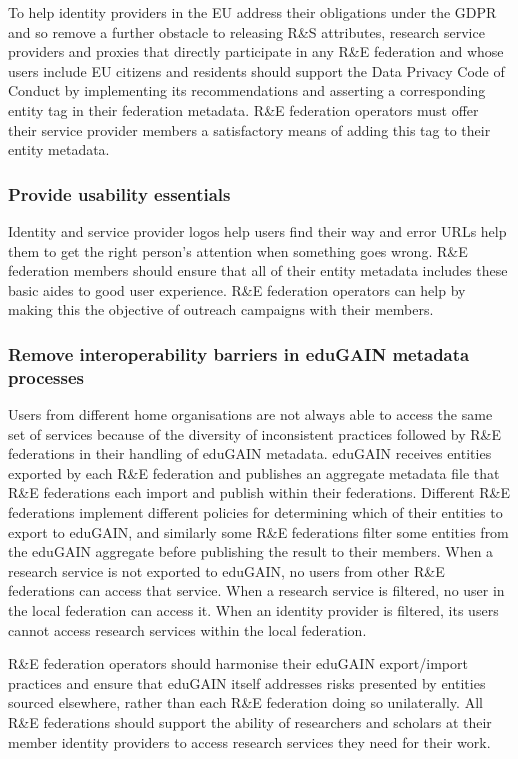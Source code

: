 \documentclass[fleqn,11pt]{wlscirep}
\begin{document}
{To help identity providers in the EU address their obligations under the GDPR and so remove a further obstacle to releasing R\&S attributes, research service providers and proxies that directly participate in any R\&E federation and whose users include EU citizens and residents should support the Data Privacy Code of Conduct by implementing its recommendations and asserting a corresponding entity tag in their federation metadata. R\&E federation operators must offer their service provider members a satisfactory means of adding this tag to their entity metadata.

\subsubsection{Provide usability essentials}
Identity and service provider logos help users find their way and error URLs help them to get the right person’s attention when something goes wrong. R\&E federation members should ensure that all of their entity metadata includes these basic aides to good user experience. R\&E federation operators can help by making this the objective of outreach campaigns with their members.

\subsubsection{Remove interoperability barriers in eduGAIN metadata processes}
Users from different home organisations are not always able to access the same set of services because of the diversity of inconsistent practices followed by R\&E federations in their handling of eduGAIN metadata. eduGAIN receives entities exported by each R\&E federation and publishes an aggregate  metadata  file  that R\&E federations each import and publish within their federations.  Different R\&E federations implement different policies for determining which of their entities to export to eduGAIN, and similarly some R\&E federations filter some entities from the eduGAIN aggregate before publishing the result to their members. When a research service is not exported to eduGAIN, no users from other R\&E federations can access that service. When a research service is filtered, no user in the local federation can access it. When an identity provider is filtered, its users cannot access research services within the local federation.

R\&E federation operators should harmonise their eduGAIN export/import practices and ensure that eduGAIN itself addresses risks presented by entities sourced elsewhere, rather than each R\&E federation doing so unilaterally. All R\&E federations should support the ability of researchers and scholars at their member identity providers to access research services they need for their work.

}
\end{document}
